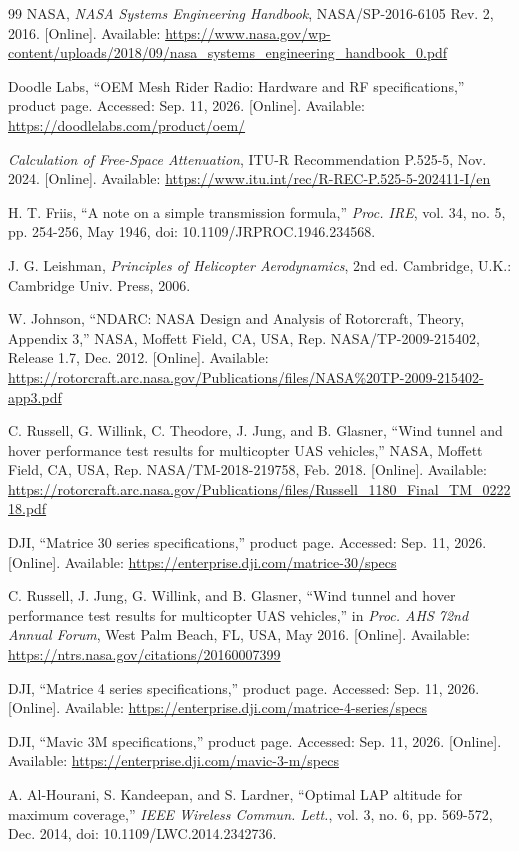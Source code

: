 \documentclass[twocolumn,letterpaper]{IEEEAerospaceCLS}
\begin{document}
\begin{thebibliography}{99}
 NASA, \emph{NASA Systems Engineering Handbook}, NASA/SP-2016-6105 Rev. 2, 2016. [Online]. Available: \url{https://www.nasa.gov/wp-content/uploads/2018/09/nasa_systems_engineering_handbook_0.pdf}

 Doodle Labs, ``OEM Mesh Rider Radio: Hardware and RF specifications,'' product page. Accessed: Sep. 11, 2026. [Online]. Available: \url{https://doodlelabs.com/product/oem/}

 \emph{Calculation of Free-Space Attenuation}, ITU-R Recommendation P.525-5, Nov. 2024. [Online]. Available: \url{https://www.itu.int/rec/R-REC-P.525-5-202411-I/en}

 H. T. Friis, ``A note on a simple transmission formula,'' \emph{Proc. IRE}, vol. 34, no. 5, pp. 254-256, May 1946, doi: 10.1109/JRPROC.1946.234568.

 J. G. Leishman, \emph{Principles of Helicopter Aerodynamics}, 2nd ed. Cambridge, U.K.: Cambridge Univ. Press, 2006.

 W. Johnson, ``NDARC: NASA Design and Analysis of Rotorcraft, Theory, Appendix 3,'' NASA, Moffett Field, CA, USA, Rep. NASA/TP-2009-215402, Release 1.7, Dec. 2012. [Online]. Available: \url{https://rotorcraft.arc.nasa.gov/Publications/files/NASA\%20TP-2009-215402-app3.pdf}

 C. Russell, G. Willink, C. Theodore, J. Jung, and B. Glasner, ``Wind tunnel and hover performance test results for multicopter UAS vehicles,'' NASA, Moffett Field, CA, USA, Rep. NASA/TM-2018-219758, Feb. 2018. [Online]. Available: \url{https://rotorcraft.arc.nasa.gov/Publications/files/Russell_1180_Final_TM_022218.pdf}

 DJI, ``Matrice 30 series specifications,'' product page. Accessed: Sep. 11, 2026. [Online]. Available: \url{https://enterprise.dji.com/matrice-30/specs}

 C. Russell, J. Jung, G. Willink, and B. Glasner, ``Wind tunnel and hover performance test results for multicopter UAS vehicles,'' in \emph{Proc. AHS 72nd Annual Forum}, West Palm Beach, FL, USA, May 2016. [Online]. Available: \url{https://ntrs.nasa.gov/citations/20160007399}

 DJI, ``Matrice 4 series specifications,'' product page. Accessed: Sep. 11, 2026. [Online]. Available: \url{https://enterprise.dji.com/matrice-4-series/specs}

 DJI, ``Mavic 3M specifications,'' product page. Accessed: Sep. 11, 2026. [Online]. Available: \url{https://enterprise.dji.com/mavic-3-m/specs}

 A. Al-Hourani, S. Kandeepan, and S. Lardner, ``Optimal LAP altitude for maximum coverage,'' \emph{IEEE Wireless Commun. Lett.}, vol. 3, no. 6, pp. 569-572, Dec. 2014, doi: 10.1109/LWC.2014.2342736.

\end{thebibliography}
\end{document}
